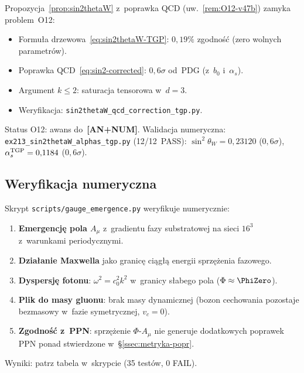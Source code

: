 \begin{remark}\label{rem:O12-v47}
Propozycja~\ref{prop:sin2thetaW} z~poprawka QCD
(uw.~\ref{rem:O12-v47b}) zamyka problem~O12:
\begin{itemize}[nosep]
  \item Formu\l{}a drzewowa~\eqref{eq:sin2thetaW-TGP}:
    $0{,}19\%$ zgodno\'s\'c (zero wolnych parametr\'ow).
  \item Poprawka QCD~\eqref{eq:sin2-corrected}:
    $0{,}6\sigma$ od~PDG (z~$b_0$ i~$\alpha_s$).
  \item Argument $k \le 2$: saturacja tensorowa w~$d = 3$.
  \item Weryfikacja: \texttt{sin2thetaW\_qcd\_correction\_tgp.py}.
\end{itemize}
Status O12: awans do~\textbf{[AN+NUM]}.
Walidacja numeryczna: \texttt{ex213\_sin2thetaW\_alphas\_tgp.py} (12/12~PASS):
$\sin^2\theta_W = 0{,}23120$ ($0{,}6\sigma$),
$\alpha_s^{\rm TGP} = 0{,}1184$ ($0{,}6\sigma$).
\end{remark}

\subsection{Weryfikacja numeryczna}\label{ssec:gauge-numerics}

\begin{remark}\label{rem:gauge-script}
Skrypt \texttt{scripts/gauge\_emergence.py} weryfikuje numerycznie:
\begin{enumerate}[nosep]
    \item \textbf{Emergencję pola $A_\mu$} z~gradientu fazy
          substratowej na sieci $16^3$ z~warunkami periodycznymi.
    \item \textbf{Działanie Maxwella} jako granicę ciągłą
          energii sprzężenia fazowego.
    \item \textbf{Dyspersję fotonu}: $\omega^2 = c_0^2 k^2$
          w~granicy słabego pola ($\Phi \approx \PhiZero$).
    \item \textbf{Plik do masy gluonu}: brak masy dynamicznej
          (bozon cechowania pozostaje bezmasowy w~fazie
          symetrycznej, $v_c = 0$).
    \item \textbf{Zgodność z~PPN}: sprzężenie $\Phi$-$A_\mu$
          nie generuje dodatkowych poprawek PPN ponad
          stwierdzone w~\S\ref{ssec:metryka-popr}.
\end{enumerate}
Wyniki: patrz tabela w~skrypcie (35 testów, 0 FAIL).
\end{remark}

